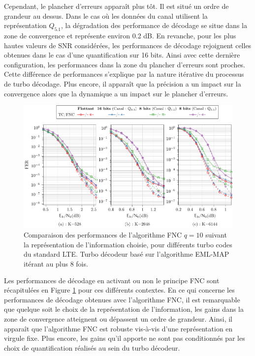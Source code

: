 Cependant, le plancher d'erreurs apparaît plus tôt. Il est situé un ordre de grandeur au dessus. Dans le cas où les 
données du canal utilisent la représentation $Q_{5.1}$, la dégradation des performance de décodage se situe dans la zone 
de convergence et représente environ 0.2 dB. En revanche, pour 
les plus hautes valeurs de SNR considérées, les performances de décodage rejoignent celles obtenues dans le cas d'une 
quantification sur 16 bits. Ainsi avec cette dernière configuration, les performances dans la zone du plancher 
d'erreurs sont proches. Cette différence de performances s'explique par la nature itérative du processus de turbo 
décodage. Plus encore, il apparaît que la précision a un impact sur la convergence alors que la dynamique a un impact sur le plancher d'erreurs.

\begin{figure}[!t]
	\centering
	\hspace*{-.1\textwidth}
	\includegraphics[width=1.1\textwidth]{main/ch4_fig/final/tikz_last/fnc10_format_refs_3.pdf}
	\caption{Comparaison des performances de l'algorithme FNC $q=10$ 
	suivant la représentation de l'information choisie, pour différents turbo codes du standard LTE.
	Turbo décodeur basé sur l'algorithme EML-MAP itérant au plus 8 fois.
	\label{fig:fnc_format_refs}}
	\vspace*{-1ex}
\end{figure}

Les performances de décodage en activant ou non le principe FNC sont récapitulées en Figure \ref{fig:fnc_format_refs} pour
ces différents contextes. 
En ce qui concerne les performances de décodage obtenues avec l'algorithme FNC, il est remarquable que quelque soit le 
choix de la représentation de l'information, les gains dans la zone de convergence atteignent ou dépassent un ordre de 
grandeur. Ainsi, il apparaît que l'algorithme FNC est robuste vis-à-vis d'une représentation en virgule fixe. Plus encore, les
gains qu'il apporte ne sont pas conditionnés par les choix de quantification réalisés au sein du turbo décodeur.

